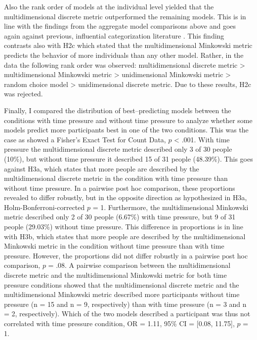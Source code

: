 \documentclass[a4paper,man,natbib]{apa6}
\begin{document}
Also the rank order of models at the individual level yielded that the multidimensional discrete metric outperformed the remaining models. This is in line with the findings from the aggregate model comparisons above and goes again against previous, influential categorization literature \citep{nosofsky1986attention, nosofsky1989further, smith1998prototypes, nosofsky1994rule, nosofsky1984choice}. This finding contrasts also with H2c which stated that the multidimensional Minkowski metric predicts the behavior of more individuals than any other model. Rather, in the data the following rank order was observed: multidimensional discrete metric > multidimensional Minkowski metric > unidimensional Minkowski metric > random choice model > unidimensional discrete metric. Due to these results, H2c was rejected.

Finally, I compared the distribution of best--predicting models between the conditions with time pressure and without time pressure to analyze whether some models predict more participants best in one of the two conditions. This was the case as showed a Fisher's Exact Test for Count Data, $p$ < .001. With time pressure the multidimensional discrete metric described only 3 of 30 people (10\%), but without time pressure it described 15 of 31 people (48.39\%). This goes against H3a, which states that more people are described by the multidimensional discrete metric in the condition with time pressure than without time pressure. In a pairwise post hoc comparison, these proportions revealed to differ robustly, but in the opposite direction as hypothesized in H3a, Holm-Bonferroni-corrected $p$ = 1.
Furthermore, the multidimensional Minkowski metric described only 2 of 30 people (6.67\%) with time pressure, but 9 of 31 people (29.03\%) without time pressure. This difference in proportions is in line with H3b, which states that more people are described by the multidimensional Minkowski metric in the condition without time pressure than with time pressure. However, the proportions did not differ robustly in a pairwise post hoc comparison, $p$ = .08.
A pairwise comparison between the multidimensional discrete metric and the multidimensional Minkowski metric for both time pressure conditions showed that the multidimensional discrete metric and the multidimensional Minkowski metric described more participants without time pressure (n = 15 and n = 9, respectively) than with time pressure (n = 3 and n = 2, respectively). Which of the two models described a participant was thus not correlated with time pressure condition, OR = 1.11, 95\% CI = [0.08, 11.75], $p$ = 1.
\end{document}
